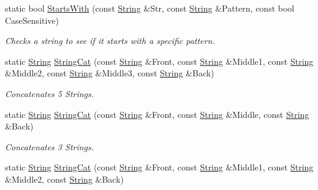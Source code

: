 \begin{DoxyCompactItemize}
static bool \hyperlink{classMezzanine_1_1StringTool_aef394e6f5c80202142de6393e7b6064c}{StartsWith} (const \hyperlink{namespaceMezzanine_acf9fcc130e6ebf08e3d8491aebcf1c86}{String} \&Str, const \hyperlink{namespaceMezzanine_acf9fcc130e6ebf08e3d8491aebcf1c86}{String} \&Pattern, const bool CaseSensitive)
\begin{DoxyCompactList}\small\item\em Checks a string to see if it starts with a specific pattern. \item\end{DoxyCompactList}\item 
static \hyperlink{namespaceMezzanine_acf9fcc130e6ebf08e3d8491aebcf1c86}{String} \hyperlink{classMezzanine_1_1StringTool_a2d622a96cd5ba4c1a220de8d8b1e5334}{StringCat} (const \hyperlink{namespaceMezzanine_acf9fcc130e6ebf08e3d8491aebcf1c86}{String} \&Front, const \hyperlink{namespaceMezzanine_acf9fcc130e6ebf08e3d8491aebcf1c86}{String} \&Middle1, const \hyperlink{namespaceMezzanine_acf9fcc130e6ebf08e3d8491aebcf1c86}{String} \&Middle2, const \hyperlink{namespaceMezzanine_acf9fcc130e6ebf08e3d8491aebcf1c86}{String} \&Middle3, const \hyperlink{namespaceMezzanine_acf9fcc130e6ebf08e3d8491aebcf1c86}{String} \&Back)
\begin{DoxyCompactList}\small\item\em Concatenates 5 Strings. \item\end{DoxyCompactList}\item 
static \hyperlink{namespaceMezzanine_acf9fcc130e6ebf08e3d8491aebcf1c86}{String} \hyperlink{classMezzanine_1_1StringTool_a162be6b13cf6fb9a75b436eaffff2847}{StringCat} (const \hyperlink{namespaceMezzanine_acf9fcc130e6ebf08e3d8491aebcf1c86}{String} \&Front, const \hyperlink{namespaceMezzanine_acf9fcc130e6ebf08e3d8491aebcf1c86}{String} \&Middle, const \hyperlink{namespaceMezzanine_acf9fcc130e6ebf08e3d8491aebcf1c86}{String} \&Back)
\begin{DoxyCompactList}\small\item\em Concatenates 3 Strings. \item\end{DoxyCompactList}\item 
static \hyperlink{namespaceMezzanine_acf9fcc130e6ebf08e3d8491aebcf1c86}{String} \hyperlink{classMezzanine_1_1StringTool_a4e93737cc124804f6d8fb70ece579611}{StringCat} (const \hyperlink{namespaceMezzanine_acf9fcc130e6ebf08e3d8491aebcf1c86}{String} \&Front, const \hyperlink{namespaceMezzanine_acf9fcc130e6ebf08e3d8491aebcf1c86}{String} \&Middle1, const \hyperlink{namespaceMezzanine_acf9fcc130e6ebf08e3d8491aebcf1c86}{String} \&Middle2, const \hyperlink{namespaceMezzanine_acf9fcc130e6ebf08e3d8491aebcf1c86}{String} \&Back)

\end{DoxyCompactItemize}
